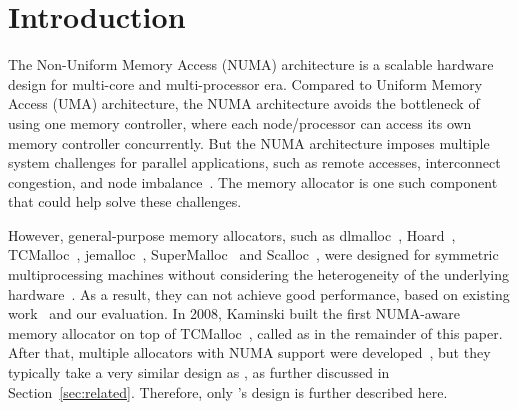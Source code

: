 
\section{Introduction}
\label{sec:intro}

The Non-Uniform Memory Access (NUMA) architecture is a scalable hardware design for multi-core and multi-processor era. Compared to Uniform Memory Access (UMA) architecture, the NUMA architecture avoids the bottleneck of using one memory controller, where each node/processor can access its own memory controller concurrently. But the NUMA architecture imposes multiple system challenges for parallel applications, such as remote accesses, interconnect congestion, and node imbalance~\citep{Blagodurov:2011:CNC:2002181.2002182}. 
The memory allocator is one such component that could help solve these challenges.   

However, general-purpose memory allocators, such as dlmalloc~\citep{dlmalloc},  Hoard~\citep{Hoard}, TCMalloc~\citep{tcmalloc}, jemalloc~\citep{jemalloc}, SuperMalloc~\citep{supermalloc} and Scalloc~\citep{Scalloc}, were designed for symmetric multiprocessing machines without considering the heterogeneity of the underlying hardware~\citep{mimalloc}. As a result, they can not achieve good performance, based on existing work~\citep{tcmallocnew, yang2019jarena} and our evaluation. In 2008, Kaminski built the first NUMA-aware memory allocator on top of TCMalloc~\citep{tcmallocnew}, called as \TN{} in the remainder of this paper. After that, multiple allocators with NUMA support were developed~\citep{ kim2013node, yang2019jarena, mimalloc}, but they typically take a very similar design as \TN{} , as further discussed in Section~\ref{sec:related}. Therefore, only \TN{}'s design is further described here. 

